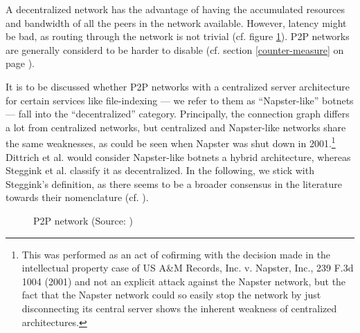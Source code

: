 \documentclass{llncs}
\begin{document}
A decentralized network has the advantage of having the accumulated
resources and bandwidth of all the peers in the network
available. However, latency might be bad, as routing through the
network is not trivial (cf. figure \ref{p2p-network}). P2P networks
are generally considerd to be harder to disable (cf. section
\ref{counter-measure} on page \pageref{counter-measure}).

It is to be discussed whether P2P networks with a centralized server
architecture for certain services like file-indexing --- we refer to
them as ``Napster-like'' botnets --- fall into the ``decentralized''
category. Principally, the connection graph differs a lot from
centralized networks, but centralized and Napster-like networks share
the same weaknesses, as could be seen when Napster was shut down in
2001\cite{napsterWiki}.\footnote{This was performed as an act of
  cofirming with the decision made in the intellectual property case
  of US A&M Records, Inc. v. Napster, Inc., 239 F.3d 1004 (2001) and
  not an explicit attack against the Napster network, but the fact
  that the Napster network could so easily stop the network by just
  disconnecting its central server shows the inherent weakness of
  centralized architectures.}  Dittrich et
al. \cite{dittrich2007command} would consider Napster-like botnets a
hybrid architecture, whereas Steggink et al.
\cite{steggink2007detection} classify it as decentralized. In the
following, we stick with Steggink's definition, as there seems to be a
broader consensus in the literature towards their nomenclature
(cf. \cite{td1sc}).

\begin{figure}[htbp]
  \centering
  \caption{P2P network (Source: \cite{dittrich2007command})}
  \label{p2p-network}
\end{figure}
\end{document}
